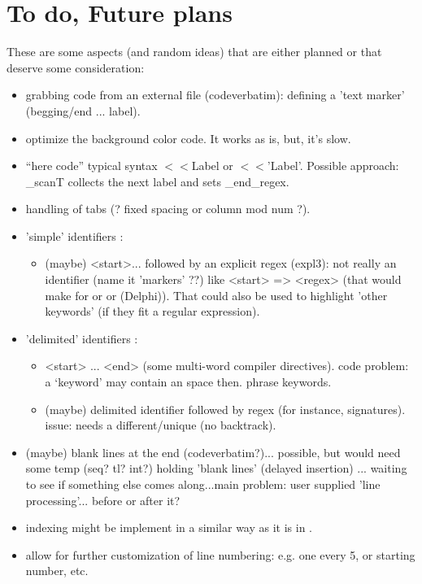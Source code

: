 \section{To do, Future plans}
These are some aspects (and random ideas) that are either planned or that deserve some consideration:
\begin{itemize}
  \item grabbing code from an external file (codeverbatim): defining a 'text marker' (begging/end ... label).
  \item optimize the background color code. It works as is, but, it's slow.
  \item ``here code'' typical syntax $<<$Label or $<<$'Label'. Possible approach: \_scanT collects the next label and sets \_end\_regex.
  \item handling of tabs (? fixed spacing or column mod num ?).
  \item 'simple' identifiers :
  \begin{itemize}
    \item (maybe) <start>... followed by an explicit regex (expl3): not really an identifier (name it 'markers' ??) like <start> => \tsfmt{\#} <regex> \tsverb{\d\d\d | \d\d | \d} (that would make for  or  or  (Delphi)). That could also be used to highlight 'other keywords' (if they fit a regular expression).
  \end{itemize}
  \item 'delimited' identifiers :
  \begin{itemize}
    \item <start> ... <end> (some multi-word compiler directives). code problem: a `keyword' may contain an space then. phrase keywords.
    \item (maybe) delimited identifier followed by regex (for instance,  signatures). issue: needs a different/unique  (no backtrack). 
  \end{itemize}
  \item (maybe) blank lines at the end (codeverbatim?)... possible, but would  need some temp (seq? tl? int?)  holding 'blank lines' (delayed insertion) ... waiting to see if something else comes along...main problem: user supplied 'line processing'... before or after it?
  \item indexing might be implement in a similar way as it is in .
  \item allow for further customization of line numbering: e.g. one every 5, or starting number, etc.

\end{itemize}

